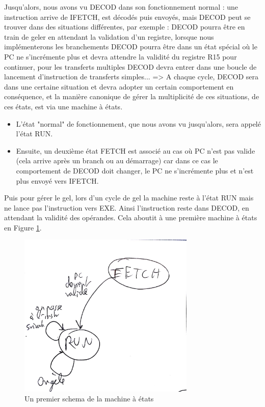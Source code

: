 \documentclass{article}
\begin{document}
Jusqu'alors, nous avons vu DECOD dans son fonctionnement normal : une instruction arrive de IFETCH,
est décodés puis envoyés, mais DECOD peut se trouver dans des situations différentes, par exemple :
DECOD pourra être en train de geler en attendant la validation d'un registre,
lorsque nous implémenterons les branchements DECOD pourra être dans un état spécial où le PC ne s'incrémente
plus et devra attendre la validité du registre R15 pour continuer, pour les transferts multiples
DECOD devra entrer dans une boucle de lancement d'instruction de transferts simples...
=> A chaque cycle, DECOD sera dans une certaine situation et devra adopter un certain comportement en conséquence,
et la manière canonique de gérer la multiplicité de ces situations, de ces états, est via une machine à états.

\begin{itemize}
 \item L'état "normal" de fonctionnement, que nous avons vu jusqu'alors, sera appelé l'état RUN.
 \item Ensuite, un deuxième état FETCH est associé au cas où PC n'est pas valide
   (cela arrive après un branch ou au démarrage) car dans ce cas le comportement de DECOD doit changer,
   le PC ne s'incrémente plus et n'est plus envoyé vers IFETCH.
\end{itemize}

Puis pour gérer le gel, lors d'un cycle de gel la machine reste à l'état RUN mais ne lance pas l'instruction
vers EXE. Ainsi l'instruction reste dans DECOD, en attendant la validité des opérandes.
Cela aboutit à une première machine à états en Figure \ref{mae_part}.

\begin{figure}[H]
\includegraphics[width=0.75\textwidth]{pics/mae_part.png}
\centering
\caption{Un premier schema de la machine à états}
\label{mae_part}
\end{figure}
\end{document}
